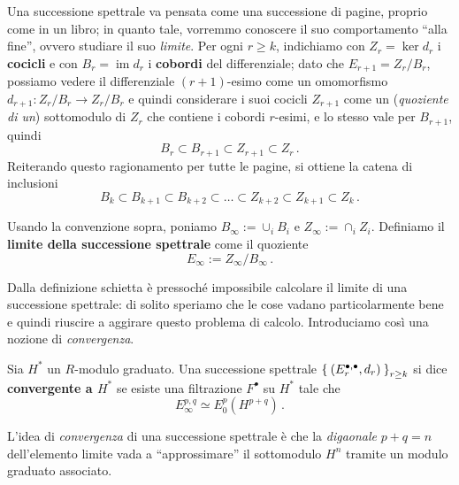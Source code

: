 Una successione spettrale va pensata come una successione di pagine,
proprio come in un libro; in quanto tale, vorremmo conoscere
il suo comportamento ``alla fine'', ovvero studiare il suo \emph{limite}.
Per ogni $r \ge k$, indichiamo con $Z_{r}=\ker d_{r}$ i \textbf{cocicli} 
e con $B_{r}=\operatorname{im}d_{r}$ i \textbf{cobordi} del differenziale;
dato che $E_{r+1}=Z_{r}/B_{r}$, possiamo vedere il differenziale $(r+1)$-esimo
come un omomorfismo $d_{r+1} : Z_{r}/B_{r} \to Z_{r}/B_{r}$ e quindi 
considerare i suoi cocicli $Z_{r+1}$ come un (\emph{quoziente di un})
sottomodulo di $Z_{r}$ che contiene i cobordi $r$-esimi,
e lo stesso vale per $B_{r+1}$, quindi
\begin{equation*}
	B_{r} \subset B_{r+1} \subset Z_{r+1} \subset Z_{r}\,. 
\end{equation*}
Reiterando questo ragionamento per tutte le pagine, si ottiene la catena di inclusioni
\begin{equation*}
	B_{k} \subset B_{k+1} \subset B_{k+2} \subset \dots \subset Z_{k+2} \subset Z_{k+1} \subset Z_{k}\,.
\end{equation*}

\begin{df}
	Usando la convenzione sopra,
	poniamo $B_{\infty} := \cup_{i} B_{i}$ e $Z_{\infty} := \cap_{i} Z_{i}$.
	Definiamo il \textbf{limite della successione spettrale} come il quoziente
	$$E_{\infty} := Z_{\infty}/B_{\infty}\,.$$
\end{df}

Dalla definizione schietta è pressoché impossibile
calcolare il limite di una successione spettrale:
di solito speriamo che le cose vadano particolarmente bene
e quindi riuscire a aggirare questo problema di calcolo.
Introduciamo così una nozione di \emph{convergenza}.

\begin{df}
	Sia $H^{*}$ un $R$-modulo graduato.
	Una successione spettrale $\Set{(E_{r}^{\bullet,\bullet},d_{r})}_{r \ge k}$
	si dice \textbf{convergente a $H^{*}$} se esiste 
	una filtrazione %
	$F^{\bullet}$ su $H^{*}$ tale che
	\begin{equation*}
		E_{\infty}^{p,q} \simeq E_{0}^{p}(H^{p+q})\,.
	\end{equation*}
\end{df}

\begin{oss}
	L'idea di \emph{convergenza} di una successione spettrale
	è che la \emph{digaonale} $p+q=n$ dell'elemento limite
	vada a ``approssimare'' il sottomodulo $H^{n}$
	tramite un modulo graduato associato.
\end{oss}

